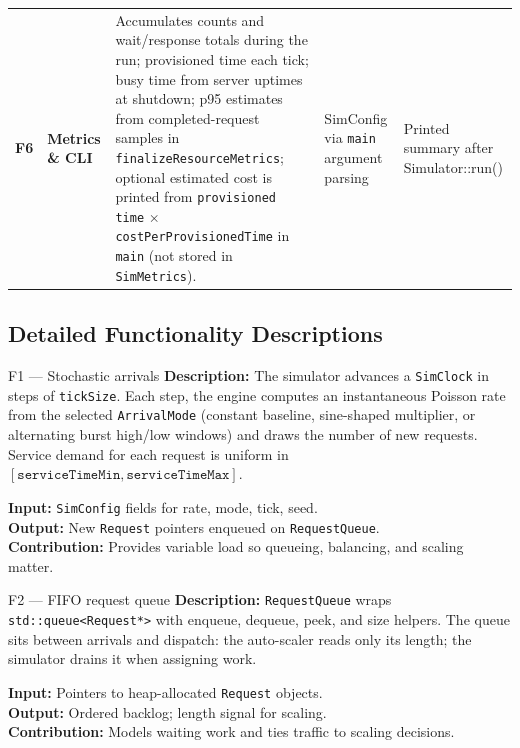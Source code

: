 \documentclass[12pt, a4paper]{article}
\newcommand{\code}[1]{\texttt{\textcolor{NUNavyL}{#1}}}
\begin{document}
\begin{longtable}{C{0.45cm} L{3.3cm} L{4.3cm} L{2.5cm} L{2.6cm}}
  \textbf{F6} & \textbf{Metrics \& CLI}
    & Accumulates counts and wait/response totals during the run; provisioned
      time each tick; busy time from server uptimes at shutdown; p95 estimates
      from completed-request samples in \code{finalizeResourceMetrics}; optional
      estimated cost is printed from \code{provisioned time} $\times$
      \code{costPerProvisionedTime} in \texttt{main} (not stored in \code{SimMetrics}).
    & SimConfig via \texttt{main} argument parsing
    & Printed summary after Simulator::run() \\

\end{longtable}

\subsection{Detailed Functionality Descriptions}

\begin{funccard}{\faCloud\enspace F1 — Stochastic arrivals}
\textbf{Description:}
The simulator advances a \code{SimClock} in steps of \code{tickSize}.
Each step, the engine computes an instantaneous Poisson rate from the
selected \code{ArrivalMode} (constant baseline, sine-shaped multiplier, or
alternating burst high/low windows) and draws the number of new requests.
Service demand for each request is uniform in
$[\texttt{serviceTimeMin},\texttt{serviceTimeMax}]$.

\medskip\noindent
\textbf{Input:}  \code{SimConfig} fields for rate, mode, tick, seed. \\
\textbf{Output:} New \code{Request} pointers enqueued on \code{RequestQueue}. \\
\textbf{Contribution:} Provides variable load so queueing, balancing, and scaling matter.
\end{funccard}

\begin{funccard}{\faInbox\enspace F2 — FIFO request queue}
\textbf{Description:}
\code{RequestQueue} wraps \code{std::queue<Request*>} with enqueue, dequeue,
peek, and size helpers.
The queue sits between arrivals and dispatch: the auto-scaler reads only its
length; the simulator drains it when assigning work.

\medskip\noindent
\textbf{Input:}  Pointers to heap-allocated \code{Request} objects. \\
\textbf{Output:} Ordered backlog; length signal for scaling. \\
\textbf{Contribution:} Models waiting work and ties traffic to scaling decisions.
\end{funccard}
\end{document}

